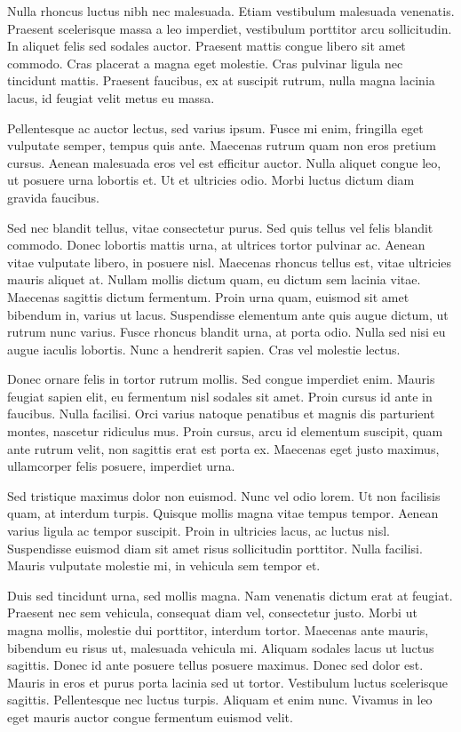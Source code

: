 \documentclass{article}
\begin{document}
Nulla rhoncus luctus nibh nec malesuada. Etiam vestibulum malesuada venenatis. Praesent scelerisque massa a leo imperdiet, vestibulum porttitor arcu sollicitudin. In aliquet felis sed sodales auctor. Praesent mattis congue libero sit amet commodo. Cras placerat a magna eget molestie. Cras pulvinar ligula nec tincidunt mattis. Praesent faucibus, ex at suscipit rutrum, nulla magna lacinia lacus, id feugiat velit metus eu massa.

Pellentesque ac auctor lectus, sed varius ipsum. Fusce mi enim, fringilla eget vulputate semper, tempus quis ante. Maecenas rutrum quam non eros pretium cursus. Aenean malesuada eros vel est efficitur auctor. Nulla aliquet congue leo, ut posuere urna lobortis et. Ut et ultricies odio. Morbi luctus dictum diam gravida faucibus.

Sed nec blandit tellus, vitae consectetur purus. Sed quis tellus vel felis blandit commodo. Donec lobortis mattis urna, at ultrices tortor pulvinar ac. Aenean vitae vulputate libero, in posuere nisl. Maecenas rhoncus tellus est, vitae ultricies mauris aliquet at. Nullam mollis dictum quam, eu dictum sem lacinia vitae. Maecenas sagittis dictum fermentum. Proin urna quam, euismod sit amet bibendum in, varius ut lacus. Suspendisse elementum ante quis augue dictum, ut rutrum nunc varius. Fusce rhoncus blandit urna, at porta odio. Nulla sed nisi eu augue iaculis lobortis. Nunc a hendrerit sapien. Cras vel molestie lectus.

Donec ornare felis in tortor rutrum mollis. Sed congue imperdiet enim. Mauris feugiat sapien elit, eu fermentum nisl sodales sit amet. Proin cursus id ante in faucibus. Nulla facilisi. Orci varius natoque penatibus et magnis dis parturient montes, nascetur ridiculus mus. Proin cursus, arcu id elementum suscipit, quam ante rutrum velit, non sagittis erat est porta ex. Maecenas eget justo maximus, ullamcorper felis posuere, imperdiet urna.

Sed tristique maximus dolor non euismod. Nunc vel odio lorem. Ut non facilisis quam, at interdum turpis. Quisque mollis magna vitae tempus tempor. Aenean varius ligula ac tempor suscipit. Proin in ultricies lacus, ac luctus nisl. Suspendisse euismod diam sit amet risus sollicitudin porttitor. Nulla facilisi. Mauris vulputate molestie mi, in vehicula sem tempor et.

Duis sed tincidunt urna, sed mollis magna. Nam venenatis dictum erat at feugiat. Praesent nec sem vehicula, consequat diam vel, consectetur justo. Morbi ut magna mollis, molestie dui porttitor, interdum tortor. Maecenas ante mauris, bibendum eu risus ut, malesuada vehicula mi. Aliquam sodales lacus ut luctus sagittis. Donec id ante posuere tellus posuere maximus. Donec sed dolor est. Mauris in eros et purus porta lacinia sed ut tortor. Vestibulum luctus scelerisque sagittis. Pellentesque nec luctus turpis. Aliquam et enim nunc. Vivamus in leo eget mauris auctor congue fermentum euismod velit.
\end{document}
